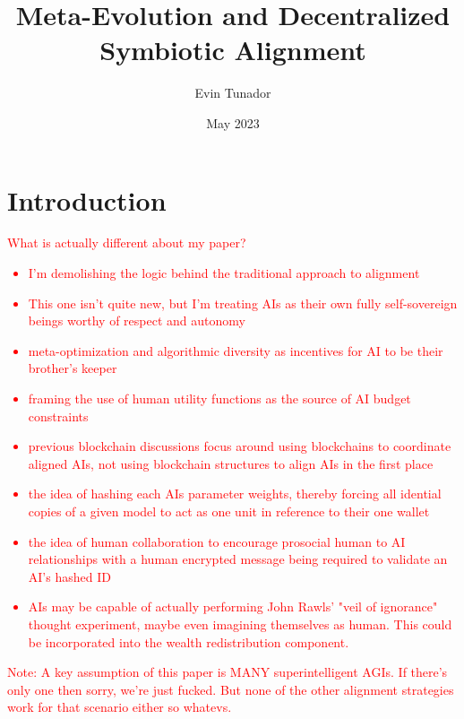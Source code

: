 \documentclass{article}[10pt]
\title{Meta-Evolution and Decentralized Symbiotic Alignment}
\author{Evin Tunador}
\date{May 2023}
\begin{document}
\onehalfspacing
\maketitle
\nocite{carlson2019safe, rawls2020theory}

\begin{abstract}
    
\end{abstract}

\tableofcontents

\section{Introduction}
\label{section:intro}

\textcolor{red}{What is actually different about my paper?}
\textcolor{red}{\begin{itemize}
    \item I'm demolishing the logic behind the traditional approach to alignment
    \item This one isn't quite new, but I'm treating AIs as their own fully self-sovereign beings worthy of respect and autonomy
    \item meta-optimization and algorithmic diversity as incentives for AI to be their brother's keeper 
    \item framing the use of human utility functions as the source of AI budget constraints
    \item previous blockchain discussions focus around using blockchains to coordinate aligned AIs, not using blockchain structures to align AIs in the first place
    \item the idea of hashing each AIs parameter weights, thereby forcing all idential copies of a given model to act as one unit in reference to their one wallet
    \item the idea of human collaboration to encourage prosocial human to AI relationships with a human encrypted message being required to validate an AI's hashed ID
    \item AIs may be capable of actually performing John Rawls' "veil of ignorance" thought experiment, maybe even imagining themselves as human. 
    This could be incorporated into the wealth redistribution component.
\end{itemize}}
\textcolor{red}{Note: A key assumption of this paper is MANY superintelligent AGIs. 
If there's only one then sorry, we're just fucked. 
But none of the other alignment strategies work for that scenario either so whatevs.}
\end{document}

